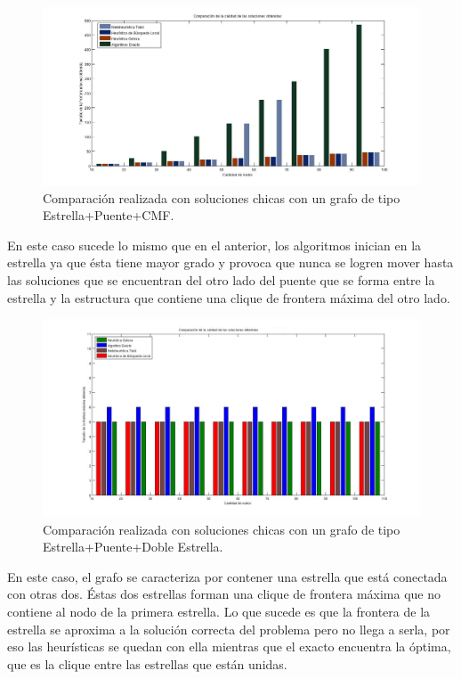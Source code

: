  \begin{figure}[H] %
\begin{center}
\includegraphics[width=500pt]{../imgs/calidadSolucionesChica14.jpg}
\caption{Comparación realizada con soluciones chicas con un grafo de tipo Estrella+Puente+CMF.}
\end{center}
\end{figure}

En este caso sucede lo mismo que en el anterior, los algoritmos inician en la estrella ya que ésta tiene mayor grado y provoca que nunca se logren mover hasta las soluciones que se encuentran del otro lado del puente que se forma entre la estrella y la estructura que contiene una clique de frontera máxima del otro lado.

 \begin{figure}[H] %
\begin{center}
\includegraphics[width=500pt]{../imgs/calidadSolucionesChicas17.jpg}
\caption{Comparación realizada con soluciones chicas con un grafo de tipo Estrella+Puente+Doble Estrella.}
\end{center}
\end{figure}


En este caso, el grafo se caracteriza por contener una estrella que está conectada con otras dos. Éstas dos estrellas forman una clique de frontera máxima que no contiene al nodo de la primera estrella. Lo que sucede es que la frontera de la estrella se aproxima a la solución correcta del problema pero no llega a serla, por eso las heurísticas se quedan con ella mientras que el exacto encuentra la óptima, que es la clique entre las estrellas que están unidas.


